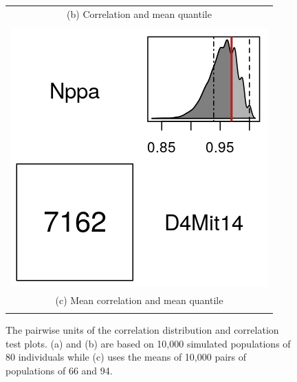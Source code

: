 \documentclass[sts]{imsart}
\begin{document}
\begin{figure}[t]
\begin{center}
\begin{tabular}{c}
      {\footnotesize (b) Correlation and mean quantile} \\
      \\
      \includegraphics[scale = 0.5]{../img/bsbCorrTest2by2a.png} \\
      {\footnotesize (c) Mean correlation and mean quantile} \\
      \\
    \end{tabular}
  \end{center}
  \caption{The pairwise units of the correlation distribution and correlation test plots. (a) and (b) are based on 10,000 simulated populations of 80 individuals while (c) uses the means of 10,000 pairs of populations of 66 and 94.}
  \label{fig:2by2}
\end{figure}
\end{document}
